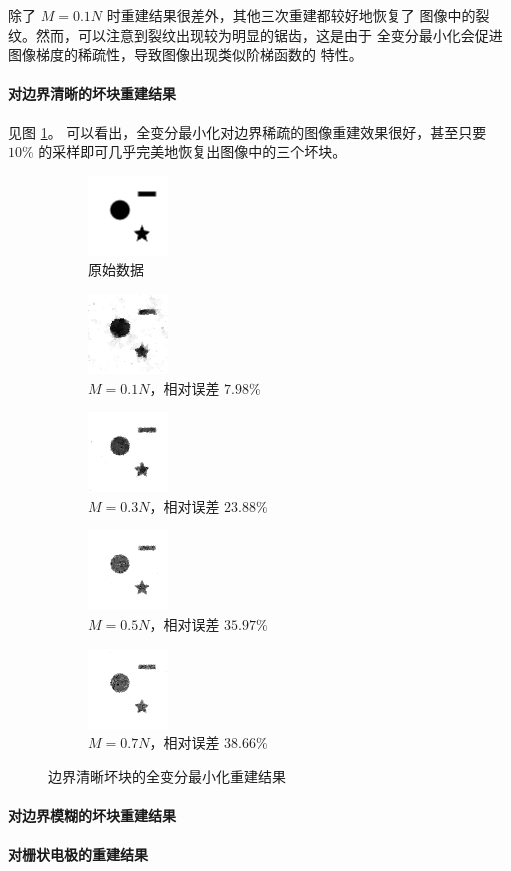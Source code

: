 除了 $M = 0.1N$ 时重建结果很差外，其他三次重建都较好地恢复了
图像中的裂纹。然而，可以注意到裂纹出现较为明显的锯齿，这是由于
全变分最小化会促进图像梯度的稀疏性，导致图像出现类似阶梯函数的
特性。

\paragraph{对边界清晰的坏块重建结果} 见图 \ref{fig:TV2dsharp}。
可以看出，全变分最小化对边界稀疏的图像重建效果很好，甚至只要
$10\%$ 的采样即可几乎完美地恢复出图像中的三个坏块。

\begin{figure}
\centering
\begin{subfigure}[t]{1in}
	\includegraphics{Figure/testdata/2dsharp.png}
	\caption{原始数据}
\end{subfigure}
\begin{subfigure}[t]{1in}
	\includegraphics{Figure/TV/2dsharp10.png}
	\caption{$M = 0.1 N$，相对误差 $7.98\%$}
\end{subfigure}
\begin{subfigure}[t]{1in}
	\includegraphics{Figure/TV/2dsharp30.png}
	\caption{$M = 0.3 N$，相对误差 $23.88\%$}
\end{subfigure}
\begin{subfigure}[t]{1in}
	\includegraphics{Figure/TV/2dsharp50.png}
	\caption{$M = 0.5 N$，相对误差 $35.97\%$}
\end{subfigure}
\begin{subfigure}[t]{1in}
	\includegraphics{Figure/TV/2dsharp70.png}
	\caption{$M = 0.7 N$，相对误差 $38.66\%$}
\end{subfigure}
\caption{边界清晰坏块的全变分最小化重建结果}
\label{fig:TV2dsharp}
\end{figure}

\paragraph{对边界模糊的坏块重建结果}

\paragraph{对栅状电极的重建结果}
